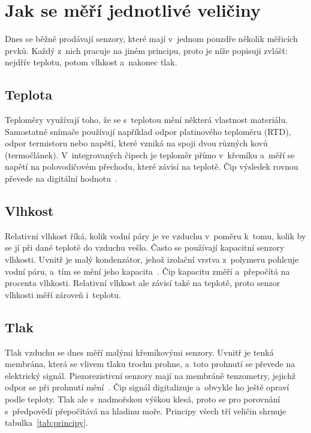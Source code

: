 \section{Jak se měří jednotlivé veličiny}

Dnes se běžně prodávají senzory, které mají v~jednom pouzdře několik měřicích prvků. Každý z~nich pracuje na jiném principu, proto je níže popisuji zvlášť: nejdřív teplotu, potom vlhkost a~nakonec tlak.

\subsection{Teplota}

Teploměry využívají toho, že se s~teplotou mění některá vlastnost materiálu. Samostatné snímače používají například odpor platinového teploměru (RTD), odpor termistoru nebo napětí, které vzniká na spoji dvou různých kovů (termočlánek). V~integrovaných čipech je teploměr přímo v~křemíku a~měří se napětí na polovodičovém přechodu, které závisí na teplotě. Čip výsledek rovnou převede na digitální hodnotu~\cite{ti}.

\subsection{Vlhkost}

Relativní vlhkost říká, kolik vodní páry je ve vzduchu v~poměru k~tomu, kolik by se jí při dané teplotě do vzduchu vešlo. Často se používají kapacitní senzory vlhkosti. Uvnitř je malý kondenzátor, jehož izolační vrstva z~polymeru pohlcuje vodní páru, a~tím se mění jeho kapacita~\cite{rotronic}. Čip kapacitu změří a~přepočítá na procenta vlhkosti. Relativní vlhkost ale závisí také na teplotě, proto senzor vlhkosti měří zároveň i~teplotu.

\subsection{Tlak}

Tlak vzduchu se dnes měří malými křemíkovými senzory. Uvnitř je tenká membrána, která se vlivem tlaku trochu prohne, a~toto prohnutí se převede na elektrický signál. Piezorezistivní senzory mají na membráně tenzometry, jejichž odpor se při prohnutí mění~\cite{bmp280}. Čip signál digitalizuje a~obvykle ho ještě opraví podle teploty. Tlak ale s~nadmořskou výškou klesá, proto se pro porovnání s~předpovědí přepočítává na hladinu moře. Principy všech tří veličin shrnuje tabulka~\ref{tab:principy}.

